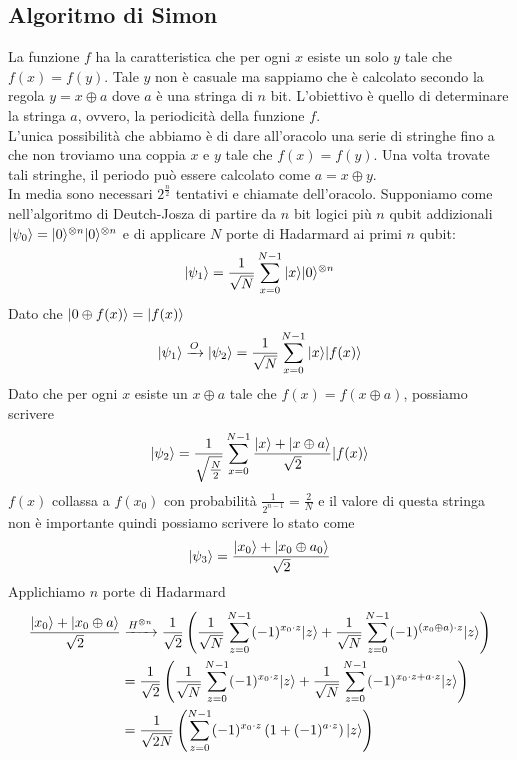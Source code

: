 \documentclass[12pt, a4paper]{report}
\begin{document}
\subsection{Algoritmo di Simon}
La funzione $f$ ha la caratteristica che per ogni $x$ esiste un solo $y$ tale che $f(x)=f(y)$. Tale $y$ non è casuale ma sappiamo che è calcolato secondo la regola $y=x\oplus a$ dove $a$ è una stringa di $n$ bit. L'obiettivo è quello di determinare la stringa $a$, ovvero, la periodicità della funzione $f$.\\
L'unica possibilità che abbiamo è di dare all'oracolo una serie di stringhe fino a che non troviamo una coppia $x$ e $y$ tale che $f(x)=f(y)$. Una volta trovate tali stringhe, il periodo può essere calcolato come $a=x\oplus y$.\\
In media sono necessari $2^{\frac{n}{2}}$ tentativi e chiamate dell'oracolo. Supponiamo come nell'algoritmo di Deutch-Josza di partire da $n$ bit logici più $n$ qubit addizionali $| \psi_{0} \rangle=| 0 \rangle^{\otimes n}| 0 \rangle^{\otimes n}$ e di applicare $N$ porte di Hadarmard ai primi $n$ qubit:
\begin{equation*}
    | \psi_{1} \rangle = \frac{1}{\sqrt{N}}\sum_{x=0}^{N-1}| x \rangle| 0 \rangle^{\otimes n}
\end{equation*}
Dato che $| 0\oplus f(x) \rangle = | f(x) \rangle$
\begin{equation*}
    | \psi_{1} \rangle \xrightarrow{O} | \psi_{2} \rangle = \frac{1}{\sqrt{N}}\sum_{x=0}^{N-1} | x \rangle| f(x) \rangle
\end{equation*}
Dato che per ogni $x$ esiste un $x\oplus a$ tale che $f(x)=f(x\oplus a)$, possiamo scrivere
\begin{equation*}
    | \psi_{2} \rangle = \frac{1}{\sqrt{\frac{N}{2}}} \sum_{x=0}^{N-1}\frac{| x \rangle+| x\oplus a \rangle}{\sqrt{2}}| f(x) \rangle
\end{equation*}
$f(x)$ collassa a $f(x_{0})$ con probabilità $\frac{1}{2^{n-1}}=\frac{2}{N}$ e il valore di questa stringa non è importante quindi possiamo scrivere lo stato come
\begin{equation*}
    | \psi_{3} \rangle=\frac{| x_{0} \rangle+| x_{0}\oplus a_{0} \rangle}{\sqrt{2}}
\end{equation*}
Applichiamo $n$ porte di Hadarmard
\begin{equation*}
    \begin{split}
        \frac{| x_{0} \rangle+| x_{0}\oplus a \rangle}{\sqrt{2}} &\xrightarrow{H^{\otimes n}} \frac{1}{\sqrt{2}}\left(\frac{1}{\sqrt{N}}\sum_{z=0}^{N-1}(-1)^{x_{0}\cdot z}| z \rangle + \frac{1}{\sqrt{N}}\sum_{z=0}^{N-1}(-1)^{(x_{0}\oplus a)\cdot z}| z \rangle\right)\\
        &= \frac{1}{\sqrt{2}}\left(\frac{1}{\sqrt{N}}\sum_{z=0}^{N-1}(-1)^{x_{0}\cdot z}| z \rangle + \frac{1}{\sqrt{N}}\sum_{z=0}^{N-1}(-1)^{x_{0}\cdot z + a\cdot z}| z \rangle\right) \\
        &= \frac{1}{\sqrt{2N}}\left(\sum_{z=0}^{N-1}(-1)^{x_{0}\cdot z}\left(1+(-1)^{a\cdot z}\right)| z \rangle\right)
    \end{split}
\end{equation*}
\end{document}
